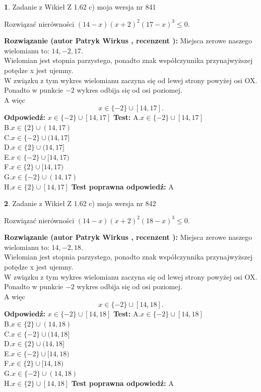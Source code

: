 \documentclass[12pt, a4paper]{article}
\theoremstyle{definition} %
\newtheorem{zad}{}
\newcommand{\zadStart}[1]{\begin{zad}#1\newline}
\newcommand{\zadStop}{\end{zad}}
\newcommand{\rozwStart}[2]{\noindent \textbf{Rozwiązanie (autor #1 , recenzent #2): }\newline}
\newcommand{\rozwStop}{\newline}
\newcommand{\odpStart}{\noindent \textbf{Odpowiedź:}\newline}
\newcommand{\odpStop}{\newline}
\newcommand{\testStart}{\noindent \textbf{Test:}\newline}
\newcommand{\testStop}{\newline}
\newcommand{\kluczStart}{\noindent \textbf{Test poprawna odpowiedź:}\newline}
\newcommand{\kluczStop}{\newline}
\begin{document}
\zadStart{Zadanie z Wikieł Z 1.62 c) moja wersja nr 841}

Rozwiązać nierówności $(14-x)(x+2)^{2}(17-x)^{3}\le0$.
\zadStop
\rozwStart{Patryk Wirkus}{}
Miejsca zerowe naszego wielomianu to: $14, -2, 17$.\\
Wielomian jest stopnia parzystego, ponadto znak współczynnika przy\linebreak najwyższej potędze x jest ujemny.\\ W związku z tym wykres wielomianu zaczyna się od lewej strony powyżej osi OX.\\
Ponadto w punkcie $-2$ wykres odbija się od osi poziomej.\\
A więc $$x \in \{-2\} \cup [14,17].$$
\rozwStop
\odpStart
$x \in \{-2\} \cup [14,17]$
\odpStop
\testStart
A.$x \in \{-2\} \cup [14,17]$\\
B.$x \in \{2\} \cup (14,17)$\\
C.$x \in \{-2\} \cup (14,17]$\\
D.$x \in \{2\} \cup (14,17]$\\
E.$x \in \{-2\} \cup [14,17)$\\
F.$x \in \{2\} \cup [14,17)$\\
G.$x \in \{-2\} \cup (14,17)$\\
H.$x \in \{2\} \cup [14,17]$
\testStop
\kluczStart
A
\kluczStop



\zadStart{Zadanie z Wikieł Z 1.62 c) moja wersja nr 842}

Rozwiązać nierówności $(14-x)(x+2)^{2}(18-x)^{3}\le0$.
\zadStop
\rozwStart{Patryk Wirkus}{}
Miejsca zerowe naszego wielomianu to: $14, -2, 18$.\\
Wielomian jest stopnia parzystego, ponadto znak współczynnika przy\linebreak najwyższej potędze x jest ujemny.\\ W związku z tym wykres wielomianu zaczyna się od lewej strony powyżej osi OX.\\
Ponadto w punkcie $-2$ wykres odbija się od osi poziomej.\\
A więc $$x \in \{-2\} \cup [14,18].$$
\rozwStop
\odpStart
$x \in \{-2\} \cup [14,18]$
\odpStop
\testStart
A.$x \in \{-2\} \cup [14,18]$\\
B.$x \in \{2\} \cup (14,18)$\\
C.$x \in \{-2\} \cup (14,18]$\\
D.$x \in \{2\} \cup (14,18]$\\
E.$x \in \{-2\} \cup [14,18)$\\
F.$x \in \{2\} \cup [14,18)$\\
G.$x \in \{-2\} \cup (14,18)$\\
H.$x \in \{2\} \cup [14,18]$
\testStop
\kluczStart
A
\kluczStop
\end{document}
